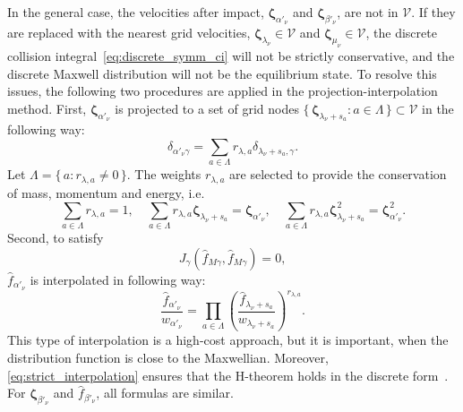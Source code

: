 \documentclass[review]{elsarticle}
\newcommand{\bzeta}{\boldsymbol{\zeta}}
\newcommand{\Set}[2]{\{\,{#1}:{#2}\,\}}
\begin{document}
In the general case, the velocities after impact,
\(\bzeta_{\alpha'_\nu}\) and \(\bzeta_{\beta'_\nu}\), are not in \(\mathcal{V}\).
If they are replaced with the nearest grid velocities,
\(\bzeta_{\lambda_\nu}\in\mathcal{V}\) and \(\bzeta_{\mu_\nu}\in\mathcal{V}\),
the discrete collision integral~\eqref{eq:discrete_symm_ci} will not be strictly conservative,
and the discrete Maxwell distribution will not be the equilibrium state.
To resolve this issues, the following two procedures are applied in the projection-interpolation method.
First, \(\bzeta_{\alpha'_\nu}\) is projected to a set of grid nodes
\(\Set{\bzeta_{\lambda_\nu+s_a}}{a\in\Lambda}\subset\mathcal{V}\) in the following way:
\begin{equation}\label{eq:ci_projection}
    \delta_{\alpha'_\nu\gamma} = \sum_{a\in\Lambda} r_{\lambda,a}\delta_{\lambda_\nu+s_a,\gamma}.
\end{equation}
Let \(\Lambda = \Set{a}{r_{\lambda,a}\neq0}\).
The weights \(r_{\lambda,a}\) are selected to provide the conservation of mass, momentum and energy, i.e.
\begin{equation}\label{eq:stencil_conservation}
    \sum_{a\in\Lambda} r_{\lambda,a} = 1, \quad
    \sum_{a\in\Lambda} r_{\lambda,a} \bzeta_{\lambda_\nu+s_a} = \bzeta_{\alpha'_\nu}, \quad
    \sum_{a\in\Lambda} r_{\lambda,a} \bzeta_{\lambda_\nu+s_a}^2 = \bzeta_{\alpha'_\nu}^2.
\end{equation}
Second, to satisfy
\begin{equation}\label{eq:strict_interpolation}
    J_\gamma(\hat{f}_{M\gamma}, \hat{f}_{M\gamma}) = 0,
\end{equation}
\(\hat{f}_{\alpha'_\nu}\) is interpolated in following way:
\begin{equation}\label{eq:ci_interpolation}
    \frac{\hat{f}_{\alpha'_\nu}}{w_{\alpha'_\nu}} = \prod_{a\in\Lambda}
        \left(\frac{\hat{f}_{\lambda_\nu+s_a}}{w_{\lambda_\nu+s_a}} \right)^{r_{\lambda,a}}.
\end{equation}
This type of interpolation is a high-cost approach, but it is important,
when the distribution function is close to the Maxwellian.
Moreover, \eqref{eq:strict_interpolation} ensures that the H-theorem holds in the discrete form~\citep{Dodulad2013}.
For \(\bzeta_{\beta'_\nu}\) and \(\hat{f}_{\beta'_\nu}\), all formulas are similar.
\end{document}

